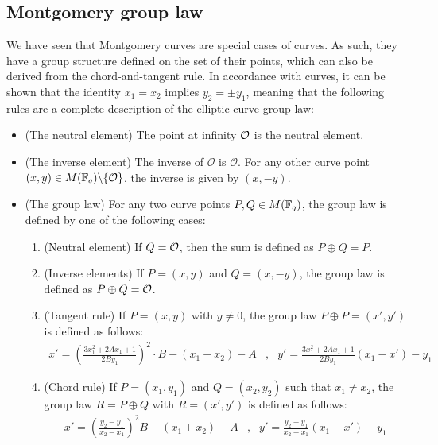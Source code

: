 \subsection{Montgomery group law} We have seen that Montgomery curves are special cases of  curves. As such, they have a group structure defined on the set of their points, which can also be derived from the chord-and-tangent rule. In accordance with  curves, it can be shown that the identity $x_1=x_2$ implies $y_2=\pm y_1$, meaning that the following rules are a complete description of the elliptic curve group law:

\begin{definition}\label{def:montgomery-group-law}

\begin{itemize}
\item (The neutral element) The point at infinity $\mathcal{O}$ is the neutral element.
\item (The inverse element) The inverse of $\mathcal{O}$ is $\mathcal{O}$. For any other curve point $(x,y) \in M(\mathbb{F}_q)\backslash \{\mathcal{O}\}$, the inverse is given by $(x,-y)$.
\item (The group law) For any two curve points $P, Q \in M(\mathbb{F}_q)$, the group law is defined by one of the following cases:
\begin{enumerate}
\item (Neutral element) If $Q=\mathcal{O}$, then the sum is defined as $P\oplus Q=P$.
\item (Inverse elements)  If $P=(x,y)$ and $Q=(x,-y)$, the group law is defined as $P\oplus Q=\mathcal{O}$.
\item (Tangent rule) If $P=(x,y)$ with $y\neq 0$, the group law $P\oplus P=(x',y')$ is defined as follows:
$$
\begin{array}{llr}
x' = (\frac{3x_1^2 + 2A x_1 +1}{2By_1})^2\cdot B - (x_1 + x_2) - A &,&
y' = \frac{3x_1^2 + 2A x_1 +1}{2By_1}(x_1-x') - y_1
\end{array} 
$$
\item (Chord rule) If $P=(x_1,y_1)$ and $Q=(x_2,y_2)$ such that $x_1 \neq x_2$, the group law $R=P\oplus Q$ with $R=(x',y')$ is defined as follows:
$$
\begin{array}{llr}
x' = (\frac{y_2-y_1}{x_2-x_1})^2B - (x_1 + x_2) - A &, &
y' = \frac{y_2-y_1}{x_2-x_1}(x_1-x') - y_1
\end{array} 
$$
\end{enumerate}
\end{itemize}
\end{definition}

